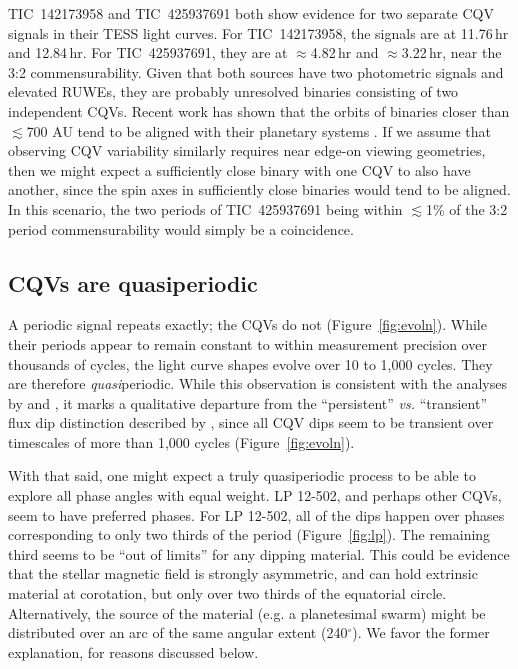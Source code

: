\documentclass[11pt,twocolumn,tighten]{aastex63}
\begin{document}
TIC~142173958 and TIC~425937691 both show evidence for two separate
CQV signals in their TESS light curves.  For TIC~142173958, the
signals are at 11.76\,hr and 12.84\,hr.  For TIC~425937691, they are
at $\approx$4.82\,hr and $\approx$3.22\,hr, near the 3:2
commensurability.  Given that both sources have two photometric
signals and elevated RUWEs, they are probably unresolved binaries
consisting of two independent CQVs.  Recent work has shown that the
orbits of binaries closer than $\lesssim$700 AU tend to be aligned
with their planetary systems \citep[e.g.][]{2022AJ....163..207C}.  If
we assume that observing CQV variability similarly requires near
edge-on viewing geometries, then we might expect a sufficiently close
binary with one CQV to also have another, since the spin axes in
sufficiently close binaries would tend to be aligned.  In this
scenario, the two periods of TIC~425937691 being within $\lesssim$1\%
of the 3:2 period commensurability would simply be a coincidence.


\subsection{CQVs are quasiperiodic}

A periodic signal repeats exactly; the CQVs do not
(Figure~\ref{fig:evoln}).  While their periods appear to remain
constant to within measurement precision over thousands of cycles, the
light curve shapes evolve over 10 to 1{,}000 cycles.  They are
therefore {\it quasi}periodic.  While this observation is consistent
with the analyses by \citet{2022AJ....163..144G} and
\citet{2023ApJ...945..114P}, it marks a qualitative departure from the
``persistent'' {\it vs.} ``transient'' flux dip distinction described
by \citet{2017AJ....153..152S}, since all CQV dips seem to be
transient over timescales of more than 1{,}000 cycles
(Figure~\ref{fig:evoln}).

With that said, one might expect a truly quasiperiodic process to be
able to explore all phase angles with equal weight.  LP 12-502, and
perhaps other CQVs, seem to have preferred phases.  For LP 12-502, all
of the dips happen over phases corresponding to only two thirds of the
period (Figure~\ref{fig:lp}).  The remaining third seems to be ``out
of limits'' for any dipping material.  This could be evidence that the
stellar magnetic field is strongly asymmetric, and can hold extrinsic
material at corotation, but only over two thirds of the equatorial
circle.  Alternatively, the source of the material (e.g. a
planetesimal swarm) might be distributed over an arc of the same
angular extent (240$^\circ$).  We favor the former explanation, for
reasons discussed below.
\end{document}
